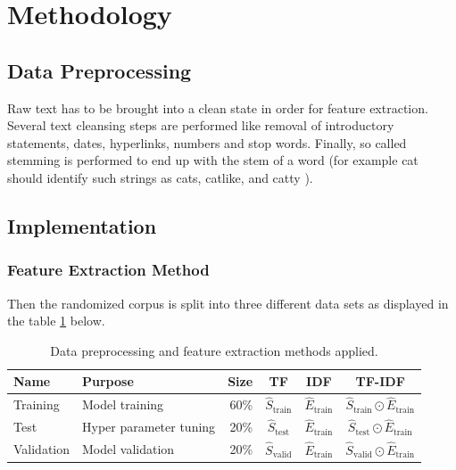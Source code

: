 \documentclass[a4paper,12pt,nottoc]{article}
\begin{document}
\section{Methodology}

\subsection{Data Preprocessing}\label{chap:data-preproc}

Raw text has to be brought into a clean state in order for feature extraction. Several text cleansing steps are performed like removal of introductory statements, dates, hyperlinks, numbers and stop words. Finally, so called stemming is performed to end up with the stem of a word (for example cat should identify such strings as cats, catlike, and catty \cite{bib:stemming}).

\subsection{Implementation}

\subsubsection{Feature Extraction Method}

Then the randomized corpus is split into three different data sets as displayed in the table \ref{tab:datapreproc} below.

\begin{table}[h]
\begin{center}
\begin{tabular}{| l | l | r | c | c | c |}
\hline
Name & Purpose & Size & TF & IDF & TF-IDF \\
\hline
Training & Model training & 60\% & $\hat{S}_{\textrm{train}}$ & $\hat{E}_{\textrm{train}}$ & $\hat{S}_{\textrm{train}} \odot \hat{E}_{\textrm{train}}$ \\  
Test & Hyper parameter tuning & 20\% & $\hat{S}_{\textrm{test}}$ & $\hat{E}_{\textrm{train}}$ & $\hat{S}_{\textrm{test}} \odot \hat{E}_{\textrm{train}}$ \\    
Validation & Model validation & 20\% & $\hat{S}_{\textrm{valid}}$ & $\hat{E}_{\textrm{train}}$ & $\hat{S}_{\textrm{valid}} \odot \hat{E}_{\textrm{train}}$ \\
\hline 
\end{tabular}
\end{center}
\caption{Data preprocessing and feature extraction methods applied.}\label{tab:datapreproc}
\end{table}
\end{document}
